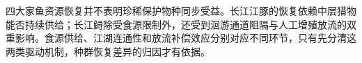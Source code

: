 四大家鱼资源恢复并不表明珍稀保护物种同步受益。长江江豚的恢复依赖中层猎物能否持续供给；长江鲟除受食源限制外，还受到洄游通道阻隔与人工增殖放流的双重影响。食源供给、江湖连通性和放流补偿效应分别对应不同环节，只有先分清这两类驱动机制，种群恢复差异的归因才有依据。
